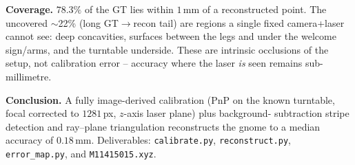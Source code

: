 \documentclass[11pt,a4paper]{article}
\begin{document}
\textbf{Coverage.} $78.3\%$ of the GT lies within $1$\,mm of a reconstructed
point. The uncovered $\sim$22\% (long GT$\to$recon tail) are regions a single
fixed camera+laser cannot see: deep concavities, surfaces between the legs and
under the welcome sign/arms, and the turntable underside. These are intrinsic
occlusions of the setup, not calibration error -- accuracy where the laser
\emph{is} seen remains sub-millimetre.

\textbf{Conclusion.} A fully image-derived calibration (PnP on the known
turntable, focal corrected to $1281$\,px, $z$-axis laser plane) plus background-
subtraction stripe detection and ray--plane triangulation reconstructs the gnome
to a median accuracy of $0.18$\,mm. Deliverables: \texttt{calibrate.py},
\texttt{reconstruct.py}, \texttt{error\_map.py}, and \texttt{M11415015.xyz}.
\end{document}
